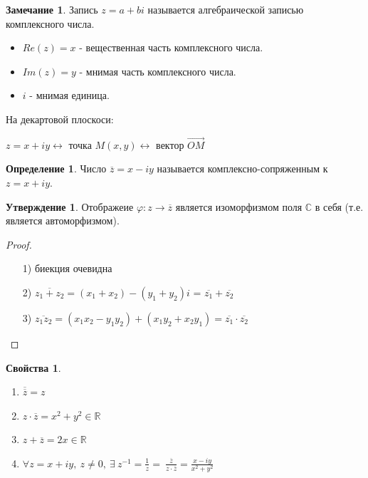 \documentclass[a4paper, 12pt]{article}
\newcommand{\R}{\mathbb R}
\renewcommand{\phi}{\varphi}
\newcommand\tab[1][.5cm]{\hspace*{#1}}
\theoremstyle{definition}
\newtheorem*{definition}{Определение}
\newtheorem*{subtheorem}{Утверждение}
\newtheorem*{remark}{Замечание}
\newtheorem*{properties}{Свойства}
\begin{document}
  \begin{remark}
    Запись $z=a+bi$ называется алгебраической записью комплексного числа.
    \begin{itemize}
      \item $Re (z) = x$ - вещественная часть комплексного числа.
      \item $Im (z) = y$ - мнимая часть комплексного числа.
      \item $i$ - мнимая единица.
    \end{itemize}
    На декартовой плоскоси: 
    \begin{center}
    \end{center}
    \begin{center}
      $z = x + iy \longleftrightarrow $ точка $M(x,y) \longleftrightarrow$ вектор $\overrightarrow{OM}$
    \end{center} 
  \end{remark}  
  \begin{definition}
    Число $\overline{z} = x-iy$ называется комплексно-сопряженным к\\ $z = x+iy$.
  \end{definition} 
  \begin{subtheorem}
    Отображеие $\phi: z \to \overline{z}$ является изоморфизмом поля $\mathbb{C}$ в себя (т.е. является автоморфизмом). 
  \end{subtheorem} 
  \begin{proof}\tab
    \begin{itemize}
      \item[1)] биекция очевидна
      \item[2)] $\overline{z_1+z_2} = (x_1 + x_2)-(y_1+y_2)i$  = $\overline{z_1}+\overline{z_2}$
      \item[3)] $\overline{z_1z_2} = (x_1x_2-y_1y_2)+(x_1y_2+x_2y_1) = \overline{z_1}\cdot \overline{z_2}$
    \end{itemize}
  \end{proof} 
  \begin{properties}\tab
    \begin{enumerate}
      \item $\overline{\overline{z}} = z$
      \item $z \cdot \overline{z} = x^2 + y^2 \in \R$
      \item $ z + \overline{z} = 2x \in \R$ 
      \item $ \forall z = x + iy, \ z \neq 0, \ \exists \ z^{-1} = \frac{1}{z} = \ \frac{\overline{z}}{z \cdot \overline{z}} = \frac{x-iy}{x^2 + y^2}$   
    \end{enumerate}
  \end{properties}
\end{document}

